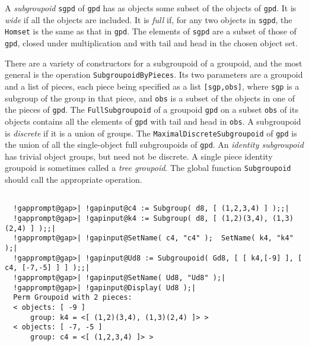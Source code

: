 \documentclass[a4paper,11pt]{report}
\begin{document}
{{{ A \emph{subgroupoid} \texttt{sgpd} of \texttt{gpd} has as objects some subset of the objects of \texttt{gpd}. It is \emph{wide} if all the objects are included. It is \emph{full} if, for any two objects in \texttt{sgpd}, the \texttt{Homset} is the same as that in \texttt{gpd}. The elements of \texttt{sgpd} are a subset of those of \texttt{gpd}, closed under multiplication and with tail and head in the chosen object set. 

 There are a variety of constructors for a subgroupoid of a groupoid, and the
most general is the operation \texttt{SubgroupoidByPieces}. Its two parameters are a groupoid and a list of pieces, each piece being
specified as a list \texttt{[sgp,obs]}, where \texttt{sgp} is a subgroup of the group in that piece, and \texttt{obs} is a subset of the objects in one of the pieces of \texttt{gpd}. The \texttt{FullSubgroupoid} of a groupoid \texttt{gpd} on a subset \texttt{obs} of its objects contains all the elements of \texttt{gpd} with tail and head in \texttt{obs}. A subgroupoid is \emph{discrete} if it is a union of groups. The \texttt{MaximalDiscreteSubgroupoid} of \texttt{gpd} is the union of all the single-object full subgroupoids of \texttt{gpd}. An  \emph{identity subgroupoid} has trivial object groups, but need not be discrete. A single piece identity
groupoid is sometimes called a  \emph{tree groupoid}. The global function \texttt{Subgroupoid} should call the appropriate operation. 

 }

 
\begin{Verbatim}[commandchars=!@|,fontsize=\small,frame=single,label=Example]
  
  !gapprompt@gap>| !gapinput@c4 := Subgroup( d8, [ (1,2,3,4) ] );;|
  !gapprompt@gap>| !gapinput@k4 := Subgroup( d8, [ (1,2)(3,4), (1,3)(2,4) ] );;|
  !gapprompt@gap>| !gapinput@SetName( c4, "c4" );  SetName( k4, "k4" );|
  !gapprompt@gap>| !gapinput@Ud8 := Subgroupoid( Gd8, [ [ k4,[-9] ], [ c4, [-7,-5] ] ] );;|
  !gapprompt@gap>| !gapinput@SetName( Ud8, "Ud8" );|
  !gapprompt@gap>| !gapinput@Display( Ud8 );|
  Perm Groupoid with 2 pieces:
  < objects: [ -9 ]
      group: k4 = <[ (1,2)(3,4), (1,3)(2,4) ]> >
  < objects: [ -7, -5 ]
      group: c4 = <[ (1,2,3,4) ]> >
  

\end{Verbatim}}}
\end{document}
